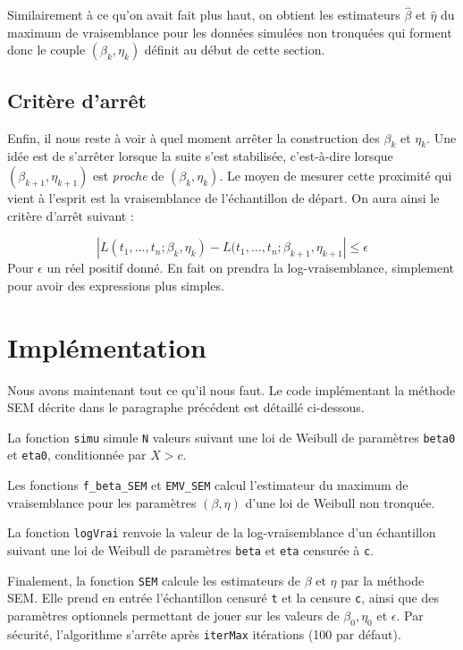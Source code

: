 \documentclass[a4paper]{report}
\begin{document}
Similairement à ce qu'on avait fait plus haut, on obtient les estimateurs $\hat{\beta}$ et $\hat{\eta}$ du maximum de vraisemblance pour les données simulées non tronquées qui forment donc le couple $(\beta_k,\eta_k)$ définit au début de cette section. 


\subsection{Critère d'arrêt}

Enfin, il nous reste à voir à quel moment arrêter la construction des $\beta_k$ et $\eta_k$. 
Une idée est de s'arrêter lorsque la suite s'est stabilisée, c'est-à-dire lorsque $(\beta_{k+1},\eta_{k+1})$ est \emph{proche} de $(\beta_k,\eta_k)$. Le moyen de mesurer cette proximité qui vient à l'esprit est la vraisemblance de l'échantillon de départ. On aura ainsi le critère d'arrêt suivant : 

\[ | L(t_1,...,t_n;\beta_k,\eta_k) - L(t_1,...,t_n;\beta_{k+1},\eta_{k+1} | \leq \epsilon \]
Pour $\epsilon$ un réel positif donné. En fait on prendra la log-vraisemblance, simplement pour
avoir des expressions plus simples.

\section{Implémentation \label{sec:impl2}}

Nous avons maintenant tout ce qu'il nous faut. Le code implémentant la méthode SEM décrite dans le paragraphe précédent est détaillé ci-dessous.

La fonction \verb|simu| simule \verb|N| valeurs suivant une loi de Weibull de paramètres \verb|beta0| et \verb|eta0|, conditionnée par $X>c$.



Les fonctions \verb|f_beta_SEM| et \verb|EMV_SEM| calcul l'estimateur du maximum de vraisemblance pour les paramètres $(\beta,\eta)$ d'une loi de Weibull non tronquée. 


La fonction \verb|logVrai| renvoie la valeur de la log-vraisemblance d'un échantillon suivant une loi de Weibull de paramètres \verb|beta| et \verb|eta| censurée à \verb|c|.


Finalement, la fonction \verb|SEM| calcule les estimateurs de $\beta$ et $\eta$ par la méthode SEM. Elle prend en entrée l'échantillon censuré \verb|t| et la censure \verb|c|, ainsi que des paramètres optionnels permettant de jouer sur les valeurs de $\beta_0, \eta_0$ et $\epsilon$. Par sécurité, l'algorithme s'arrête après \verb|iterMax| itérations (100 par défaut).
 
 
\end{document}
